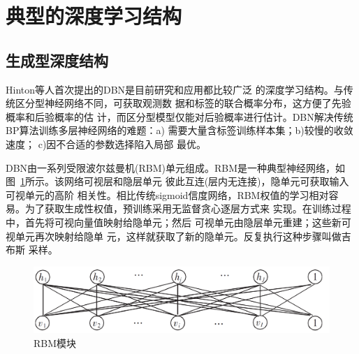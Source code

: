 \documentclass[UTF8]{article}
\begin{document}
	\section{典型的深度学习结构}
	\subsection{生成型深度结构}
	Hinton等人\cite{v3}首次提出的DBN是目前研究和应用都比较广泛
	的深度学习结构。与传统区分型神经网络不同，可获取观测数
	据和标签的联合概率分布，这方便了先验概率和后验概率的估
	计，而区分型模型仅能对后验概率进行估计。DBN解决传统
	BP算法训练多层神经网络的难题：a) 需要大量含标签训练样本集；b)较慢的收敛速度；
c)因不合适的参数选择陷入局部
	最优。
	
	DBN由一系列受限波尔兹曼机(RBM)单元组成。RBM是一种典型神经网络，如图~\ref{fig:p2}所示。该网络可视层和隐层单元
	彼此互连(层内无连接)，隐单元可获取输入可视单元的高阶
	相关性。相比传统sigmoid信度网络，RBM权值的学习相对容
	易。为了获取生成性权值，预训练采用无监督贪心逐层方式来
	实现。在训练过程中，首先将可视向量值映射给隐单元；然后
	可视单元由隐层单元重建；这些新可视单元再次映射给隐单
	元，这样就获取了新的隐单元。反复执行这种步骤叫做吉布斯
	采样。
	\begin{figure}[htbp]
	\centering
	\includegraphics[scale = 0.4]{Figures/2.png} 
	\caption{RBM模块}
	\label{fig:p2}
	\end{figure}
	
\end{document}
